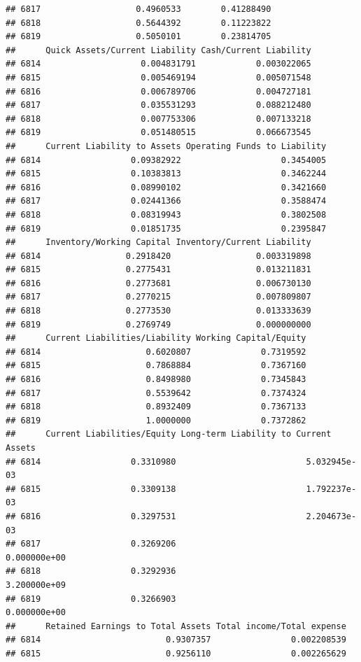 \documentclass[
]{book}
\begin{document}
\begin{verbatim}
## 6817                   0.4960533        0.41288490
## 6818                   0.5644392        0.11223822
## 6819                   0.5050101        0.23814705
##      Quick Assets/Current Liability Cash/Current Liability
## 6814                    0.004831791            0.003022065
## 6815                    0.005469194            0.005071548
## 6816                    0.006789706            0.004727181
## 6817                    0.035531293            0.088212480
## 6818                    0.007753306            0.007133218
## 6819                    0.051480515            0.066673545
##      Current Liability to Assets Operating Funds to Liability
## 6814                  0.09382922                    0.3454005
## 6815                  0.10383813                    0.3462244
## 6816                  0.08990102                    0.3421660
## 6817                  0.02441366                    0.3588474
## 6818                  0.08319943                    0.3802508
## 6819                  0.01851735                    0.2395847
##      Inventory/Working Capital Inventory/Current Liability
## 6814                 0.2918420                 0.003319898
## 6815                 0.2775431                 0.013211831
## 6816                 0.2773681                 0.006730130
## 6817                 0.2770215                 0.007809807
## 6818                 0.2773530                 0.013333639
## 6819                 0.2769749                 0.000000000
##      Current Liabilities/Liability Working Capital/Equity
## 6814                     0.6020807              0.7319592
## 6815                     0.7868884              0.7367160
## 6816                     0.8498980              0.7345843
## 6817                     0.5539642              0.7374324
## 6818                     0.8932409              0.7367133
## 6819                     1.0000000              0.7372862
##      Current Liabilities/Equity Long-term Liability to Current Assets
## 6814                  0.3310980                          5.032945e-03
## 6815                  0.3309138                          1.792237e-03
## 6816                  0.3297531                          2.204673e-03
## 6817                  0.3269206                          0.000000e+00
## 6818                  0.3292936                          3.200000e+09
## 6819                  0.3266903                          0.000000e+00
##      Retained Earnings to Total Assets Total income/Total expense
## 6814                         0.9307357                0.002208539
## 6815                         0.9256110                0.002265629

\end{verbatim}
\end{document}

